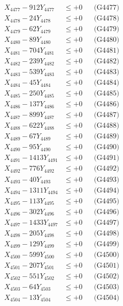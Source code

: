 \documentclass[a4paper,10pt]{article}
\begin{document}
{\begin{align}
X_{4477} - 912Y_{4477} &\leq +0 && \text{(G4477)} \\
X_{4478} - 24Y_{4478} &\leq +0 && \text{(G4478)} \\
X_{4479} - 62Y_{4479} &\leq +0 && \text{(G4479)} \\
X_{4480} - 89Y_{4480} &\leq +0 && \text{(G4480)} \\
\allowbreak
X_{4481} - 704Y_{4481} &\leq +0 && \text{(G4481)} \\
X_{4482} - 239Y_{4482} &\leq +0 && \text{(G4482)} \\
X_{4483} - 539Y_{4483} &\leq +0 && \text{(G4483)} \\
X_{4484} - 45Y_{4484} &\leq +0 && \text{(G4484)} \\
X_{4485} - 250Y_{4485} &\leq +0 && \text{(G4485)} \\
X_{4486} - 137Y_{4486} &\leq +0 && \text{(G4486)} \\
X_{4487} - 899Y_{4487} &\leq +0 && \text{(G4487)} \\
X_{4488} - 622Y_{4488} &\leq +0 && \text{(G4488)} \\
X_{4489} - 67Y_{4489} &\leq +0 && \text{(G4489)} \\
X_{4490} - 95Y_{4490} &\leq +0 && \text{(G4490)} \\
\allowbreak
X_{4491} - 1413Y_{4491} &\leq +0 && \text{(G4491)} \\
X_{4492} - 776Y_{4492} &\leq +0 && \text{(G4492)} \\
X_{4493} - 40Y_{4493} &\leq +0 && \text{(G4493)} \\
X_{4494} - 1311Y_{4494} &\leq +0 && \text{(G4494)} \\
X_{4495} - 113Y_{4495} &\leq +0 && \text{(G4495)} \\
X_{4496} - 302Y_{4496} &\leq +0 && \text{(G4496)} \\
X_{4497} - 1433Y_{4497} &\leq +0 && \text{(G4497)} \\
X_{4498} - 205Y_{4498} &\leq +0 && \text{(G4498)} \\
X_{4499} - 129Y_{4499} &\leq +0 && \text{(G4499)} \\
X_{4500} - 599Y_{4500} &\leq +0 && \text{(G4500)} \\
\allowbreak
X_{4501} - 207Y_{4501} &\leq +0 && \text{(G4501)} \\
X_{4502} - 551Y_{4502} &\leq +0 && \text{(G4502)} \\
X_{4503} - 64Y_{4503} &\leq +0 && \text{(G4503)} \\
X_{4504} - 13Y_{4504} &\leq +0 && \text{(G4504)} \\

\end{align}}
\end{document}
